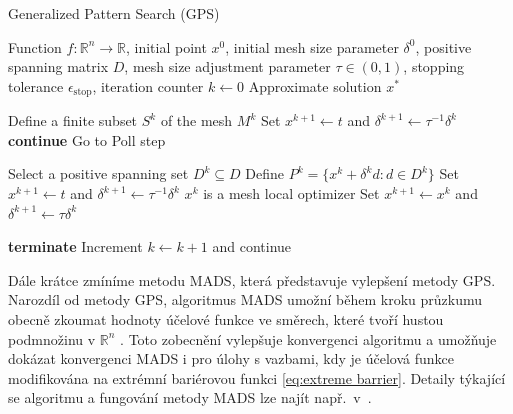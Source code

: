 \begin{algorithm}[H]
	\caption{Generalized Pattern Search (GPS)}\label{GPS}
	\begin{algorithmic}[1]
		\Require Function $f: \mathbb{R}^n \to \mathbb{R}$, initial point $x^0$, initial mesh size parameter $\delta^0$, positive spanning matrix $D$, mesh size adjustment parameter $\tau \in (0, 1)$, stopping tolerance $\epsilon_{\text{stop}}$, iteration counter $k \gets 0$
		\Ensure Approximate solution $x^*$
		
		
		
		\State Define a finite subset $S^k$ of the mesh $M^k$
		\State Set $x^{k+1} \gets t$ and $\delta^{k+1} \gets \tau^{-1} \delta^k$
		\State \textbf{continue}
		\Else
		\State Go to Poll step
		\EndIf
		
		\State Select a positive spanning set $D^k \subseteq D$
		\State Define $P^k = \{x^k + \delta^k d : d \in D^k\}$
		\State Set $x^{k+1} \gets t$ and $\delta^{k+1} \gets \tau^{-1} \delta^k$
		\Else
		\State $x^k$ is a mesh local optimizer
		\State Set $x^{k+1} \gets x^k$ and $\delta^{k+1} \gets \tau \delta^k$
		\EndIf
		
		\State \textbf{terminate}
		\Else
		\State Increment $k \gets k+1$ and continue
		\EndIf
		
		\EndWhile
		\EndProcedure
	\end{algorithmic}
\end{algorithm}


Dále krátce zmíníme metodu MADS, která představuje vylepšení metody GPS. Narozdíl od metody GPS, algoritmus MADS umožní během kroku průzkumu obecně zkoumat hodnoty účelové funkce ve směrech, které tvoří hustou podmnožinu v $ \mathbb{R}^{n} $ \cite{BBO-textbook, derivative-free-review}. Toto zobecnění vylepšuje konvergenci algoritmu a umožňuje dokázat konvergenci MADS i pro úlohy s vazbami, kdy je účelová funkce modifikována na extrémní bariérovou funkci \ref{eq:extreme barrier}. Detaily týkající se algoritmu a fungování metody MADS lze najít např.~v~\cite{BBO-textbook}.



